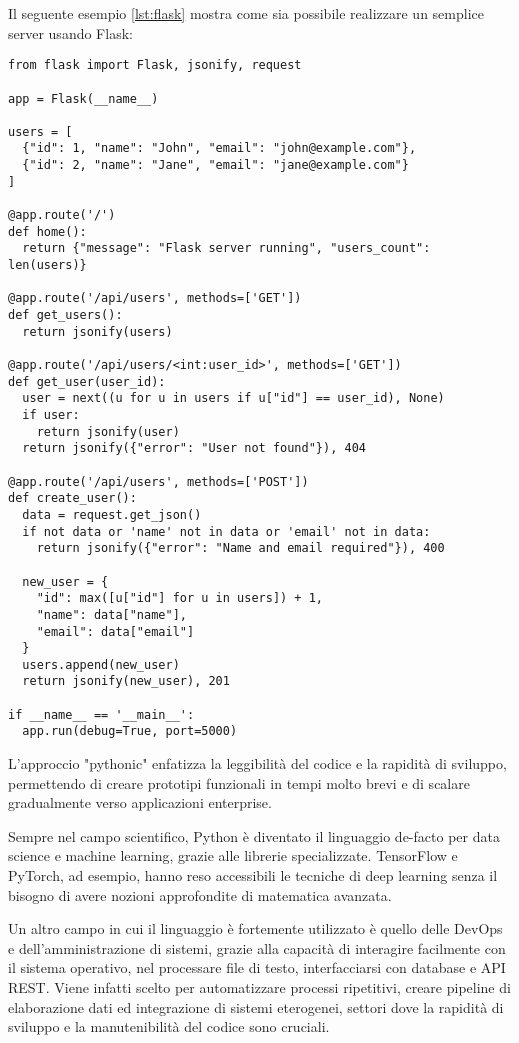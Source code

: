 Il seguente esempio \ref{lst:flask} mostra come sia possibile realizzare un semplice server usando Flask:

\begin{lstlisting}[caption={Server Flask base in Python}, label=lst:flask]
from flask import Flask, jsonify, request

app = Flask(__name__)

users = [
  {"id": 1, "name": "John", "email": "john@example.com"},
  {"id": 2, "name": "Jane", "email": "jane@example.com"}
]

@app.route('/')
def home():
  return {"message": "Flask server running", "users_count": len(users)}

@app.route('/api/users', methods=['GET'])
def get_users():
  return jsonify(users)

@app.route('/api/users/<int:user_id>', methods=['GET'])
def get_user(user_id):
  user = next((u for u in users if u["id"] == user_id), None)
  if user:
    return jsonify(user)
  return jsonify({"error": "User not found"}), 404

@app.route('/api/users', methods=['POST'])
def create_user():
  data = request.get_json()
  if not data or 'name' not in data or 'email' not in data:
    return jsonify({"error": "Name and email required"}), 400

  new_user = {
    "id": max([u["id"] for u in users]) + 1,
    "name": data["name"],
    "email": data["email"]
  }
  users.append(new_user)
  return jsonify(new_user), 201

if __name__ == '__main__':
  app.run(debug=True, port=5000)
\end{lstlisting}

L'approccio "pythonic" enfatizza la leggibilità del codice e la rapidità di sviluppo, permettendo di creare prototipi funzionali in tempi molto brevi e di scalare gradualmente verso applicazioni enterprise.

Sempre nel campo scientifico, Python è diventato il linguaggio de-facto per data science e machine learning, grazie alle librerie specializzate. TensorFlow e PyTorch, ad esempio, hanno reso accessibili le tecniche di deep learning senza il bisogno di avere nozioni approfondite di matematica avanzata.

Un altro campo in cui il linguaggio è fortemente utilizzato è quello delle DevOps e dell'amministrazione di sistemi, grazie alla capacità di interagire facilmente con il sistema operativo, nel processare file di testo, interfacciarsi con database e API REST. Viene infatti scelto per automatizzare processi ripetitivi, creare pipeline di elaborazione dati ed integrazione di sistemi eterogenei, settori dove la rapidità di sviluppo e la manutenibilità del codice sono cruciali.


